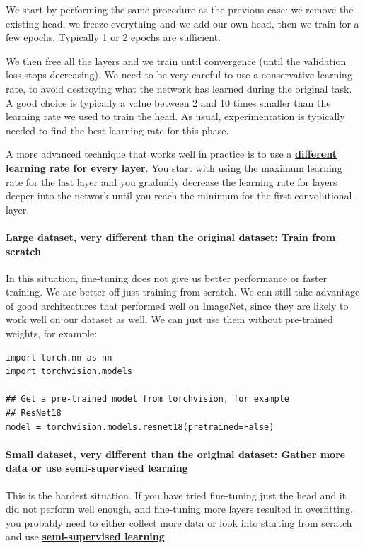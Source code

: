 We start by performing the same procedure as the previous case: we remove the existing head, we freeze everything and we add our own head, then we train for a few epochs. Typically 1 or 2 epochs are sufficient.\newline

We then free all the layers and we train until convergence (until the validation loss stops decreasing). We need to be very careful to use a conservative learning rate, to avoid destroying what the network has learned during the original task. A good choice is typically a value between 2 and 10 times smaller than the learning rate we used to train the head. As usual, experimentation is typically needed to find the best learning rate for this phase.\newline

A more advanced technique that works well in practice is to use a \href{https://arxiv.org/abs/1801.06146v5}{\textbf{different learning rate for every layer}}. You start with using the maximum learning rate for the last layer and you gradually decrease the learning rate for layers deeper into the network until you reach the minimum for the first convolutional layer.

\paragraph{Large dataset, very different than the original dataset: Train from scratch}

In this situation, fine-tuning does not give us better performance or faster training. We are better off just training from scratch. We can still take advantage of good architectures that performed well on ImageNet, since they are likely to work well on our dataset as well. We can just use them without pre-trained weights, for example:
\begin{lstlisting}
import torch.nn as nn
import torchvision.models

## Get a pre-trained model from torchvision, for example
## ResNet18
model = torchvision.models.resnet18(pretrained=False)
\end{lstlisting}
\paragraph{Small dataset, very different than the original dataset: Gather more data or use semi-supervised learning}

This is the hardest situation. If you have tried fine-tuning just the head and it did not perform well enough, and fine-tuning more layers resulted in overfitting, you probably need to either collect more data or look into starting from scratch and use \href{https://en.wikipedia.org/wiki/Semi-supervised_learning}{\textbf{semi-supervised learning}}.


